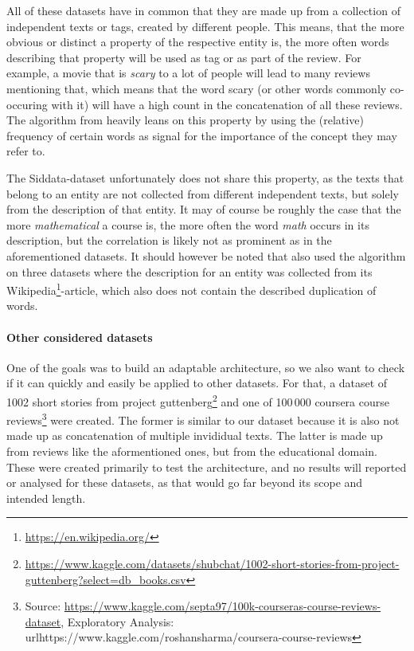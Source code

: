 

All of these datasets have in common that they are made up from a collection of independent texts or tags, created by different people. This means, that the more obvious or distinct a property of the respective entity is, the more often words describing that property will be used as tag or as part of the review. For example, a movie that is \emph{scary} to a lot of people will lead to many reviews mentioning that, which means that the word scary (or other words commonly co-occuring with it) will have a high count in the concatenation of all these reviews. The algorithm from \cite{Derrac2015} heavily leans on this property by using the (relative) frequency of certain words as signal for the importance of the concept they may refer to. 

The Siddata-dataset unfortunately does not share this property, as the texts that belong to an entity are not collected from different independent texts, but solely from the description of that entity. It may of course be roughly the case that the more \emph{mathematical} a course is, the more often the word \emph{math} occurs in its description, but the correlation is likely not as prominent as in the aforementioned datasets. It should however be noted that \cite{Alshaikh2020} also used the algorithm on three datasets where the description for an entity was collected from its Wikipedia\footnote{\url{https://en.wikipedia.org/}}-article, which also does not contain the described duplication of words.


\paragraph{Other considered datasets}

One of the goals was to build an adaptable architecture, so we also want to check if it can quickly and easily be applied to other datasets. For that, a dataset of 1002 short stories from project guttenberg\footnote{\url{https://www.kaggle.com/datasets/shubchat/1002-short-stories-from-project-guttenberg?select=db_books.csv}} and one of 100\,000 coursera course reviews\footnote{Source: \url{https://www.kaggle.com/septa97/100k-courseras-course-reviews-dataset}, Exploratory Analysis: url{https://www.kaggle.com/roshansharma/coursera-course-reviews}} were created. The former is similar to our dataset because it is also not made up as concatenation of multiple invididual texts. The latter is made up from reviews like the aformentioned ones, but from the educational domain. These were created primarily to test the architecture, and no results will reported or analysed for these datasets, as that would go far beyond its scope and intended length.


